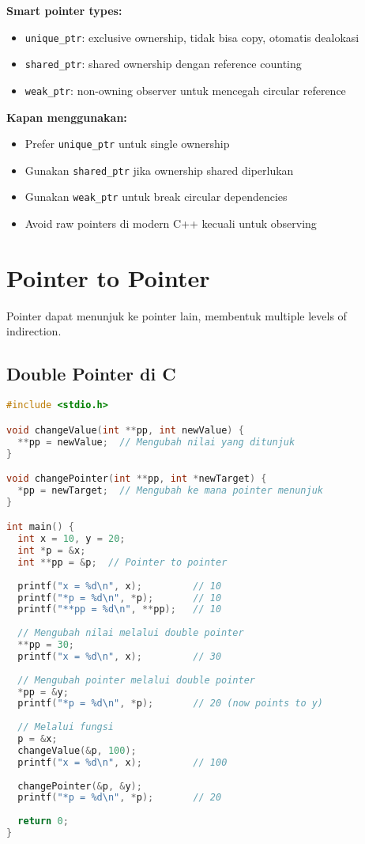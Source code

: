 \documentclass[../main.tex]{subfiles}
\begin{document}
\textbf{Smart pointer types:}
\begin{itemize}
  \item \texttt{unique\_ptr}: exclusive ownership, tidak bisa copy, otomatis dealokasi
  \item \texttt{shared\_ptr}: shared ownership dengan reference counting
  \item \texttt{weak\_ptr}: non-owning observer untuk mencegah circular reference
\end{itemize}

\textbf{Kapan menggunakan:}
\begin{itemize}
  \item Prefer \texttt{unique\_ptr} untuk single ownership
  \item Gunakan \texttt{shared\_ptr} jika ownership shared diperlukan
  \item Gunakan \texttt{weak\_ptr} untuk break circular dependencies
  \item Avoid raw pointers di modern C++ kecuali untuk observing
\end{itemize}

\section{Pointer to Pointer}

Pointer dapat menunjuk ke pointer lain, membentuk multiple levels of indirection.

\subsection{Double Pointer di C}

\begin{lstlisting}[language=C, caption={Pointer to pointer di C}]
#include <stdio.h>

void changeValue(int **pp, int newValue) {
  **pp = newValue;  // Mengubah nilai yang ditunjuk
}

void changePointer(int **pp, int *newTarget) {
  *pp = newTarget;  // Mengubah ke mana pointer menunjuk
}

int main() {
  int x = 10, y = 20;
  int *p = &x;
  int **pp = &p;  // Pointer to pointer
  
  printf("x = %d\n", x);         // 10
  printf("*p = %d\n", *p);       // 10
  printf("**pp = %d\n", **pp);   // 10
  
  // Mengubah nilai melalui double pointer
  **pp = 30;
  printf("x = %d\n", x);         // 30
  
  // Mengubah pointer melalui double pointer
  *pp = &y;
  printf("*p = %d\n", *p);       // 20 (now points to y)
  
  // Melalui fungsi
  p = &x;
  changeValue(&p, 100);
  printf("x = %d\n", x);         // 100
  
  changePointer(&p, &y);
  printf("*p = %d\n", *p);       // 20
  
  return 0;
}
\end{lstlisting}
\end{document}
